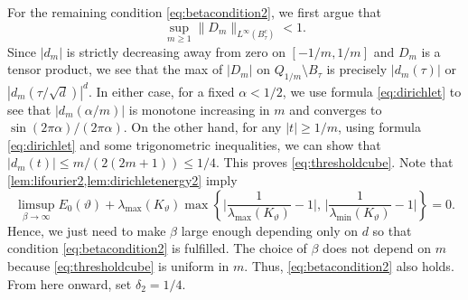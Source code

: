 \documentclass[11pt]{article}
\theoremstyle{definition}
\numberwithin{theorem}{section}
\numberwithin{lemma}{section}
\numberwithin{equation}{section}
\numberwithin{equation}{section}
\begin{document}
	For the remaining condition \eqref{eq:betacondition2}, we first argue that 
	\begin{equation}
		\label{eq:thresholdcube}
		\sup_{m\geq 1} \|D_m\|_{L^\infty(B_\tau^c)} 
		<1.
	\end{equation}
	Since $|d_m|$ is strictly decreasing away from zero on $[-1/m,1/m]$ and $D_m$ is a tensor product, we see that the max of $|D_m|$ on $Q_{1/m}\setminus B_\tau$ is precisely $|d_m(\tau)|$ or $|d_m(\tau/\sqrt d)|^d$. In either case, for a fixed $\alpha<1/2$, we use formula \eqref{eq:dirichlet} to see that $|d_m(\alpha/m)|$ is monotone increasing in $m$ and converges to $\sin(2\pi \alpha)/(2\pi \alpha)$. On the other hand, for any $|t|\geq 1/m$, using formula \eqref{eq:dirichlet} and some trigonometric inequalities, we can show that $|d_m(t)|\leq m/(2(2m+1))\leq 1/4$. This proves \eqref{eq:thresholdcube}. Note that \cref{lem:lifourier2,lem:dirichletenergy2} imply	
	$$
	\limsup_{\beta\to\infty} E_0(\vartheta)+\lambda_{\max}(K_\vartheta) \max\left\{ \Big| \frac 1 {\lambda_{\max}(K_\vartheta)}-1\Big|,\, \Big|\frac 1 {\lambda_{\min}(K_\vartheta)} - 1\Big| \right\} = 0.
	$$
	Hence, we just need to make $\beta$ large enough depending only on $d$ so that condition \eqref{eq:betacondition2} is fulfilled. The choice of $\beta$ does not depend on $m$ because \eqref{eq:thresholdcube} is uniform in $m$. Thus, \eqref{eq:betacondition2} also holds. From here onward, set $\delta_2=1/4$. 
	
\end{document}
